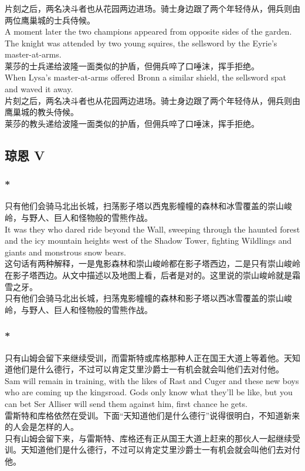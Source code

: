 \documentclass[12pt,a4paper]{article}
\newcommand{\h}[1]{{\color{red}#1}\\}
\newcommand{\la}[1]{{\color{blue}#1}\\}
\begin{document}
\subsubsection{}\la{
	片刻之后，两名决斗者也从花园两边进场。骑士身边跟了两个年轻侍从，佣兵则由两位鹰巢城的士兵侍候。\\
	A moment later the two champions appeared from opposite sides of the garden. The knight was attended by two young squires, the sellsword by the Eyrie's master-at-arms.\\
	莱莎的士兵递给波隆一面类似的护盾，但佣兵啐了口唾沫，挥手拒绝。\\
	When Lysa's master-at-arms offered Bronn a similar shield, the sellsword spat and waved it away.}
	片刻之后，两名决斗者也从花园两边进场。骑士身边跟了两个年轻侍从，佣兵则由鹰巢城的教头侍候。\\
	莱莎的教头递给波隆一面类似的护盾，但佣兵啐了口唾沫，挥手拒绝。
	
	
\subsection{琼恩 V}
\subsubsection{\color{red}*}\la{
	只有他们会骑马北出长城，扫荡影子塔以西鬼影幢幢的森林和冰雪覆盖的崇山峻岭，与野人、巨人和怪物般的雪熊作战。\\
	It was they who dared ride beyond the Wall, sweeping through the haunted forest and the icy mountain heights west of the Shadow Tower, fighting Wildlings and giants and monstrous snow bears.}\h{
	这句话有两种解释，一是鬼影森林和崇山峻岭都在影子塔西边，二是只有崇山峻岭在影子塔西边。从文中描述以及地图上看，后者是对的。这里说的崇山峻岭就是霜雪之牙。}
	只有他们会骑马北出长城，扫荡鬼影幢幢的森林和影子塔以西冰雪覆盖的崇山峻岭，与野人、巨人和怪物般的雪熊作战。
	
\subsubsection{\color{red}*}\la{
	只有山姆会留下来继续受训，而雷斯特或库格那种人正在国王大道上等着他。天知道他们是什么德行，不过可以肯定艾里沙爵士一有机会就会叫他们去对付他。\\
	Sam will remain in training, with the likes of Rast and Cuger and these new boys who are coming up the kingsroad. Gods only know what they'll be like, but you can bet Ser Alliser will send them against him, first chance he gets.}\h{
	雷斯特和库格依然在受训。下面“天知道他们是什么德行”说得很明白，不知道新来的人会是怎样的人。}
	只有山姆会留下来，与雷斯特、库格还有正从国王大道上赶来的那伙人一起继续受训。天知道他们是什么德行，不过可以肯定艾里沙爵士一有机会就会叫他们去对付他。
	
\end{document}
